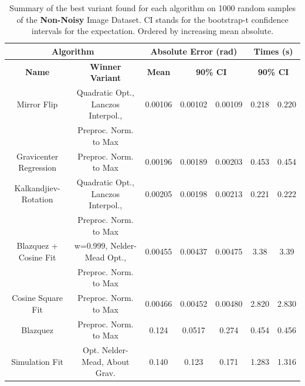 \documentclass[11pt, a4paper, twoside]{article} %
\begin{document}
\begin{table}[h!]
\caption{Summary of the best variant found for each algorithm on 1000 random samples of the {\bf Non-Noisy} Image Dataset. CI stands for the bootstrap-t confidence intervals \cite{boots} for the expectation. Ordered by increasing mean absolute.\vspace{-0.4cm}}
\center
{\small 
\label{tab:nonnoisy}
\begin{tabular}{c|c|c|cc|cc}
\toprule
\multicolumn{2}{c|}{\bf Algorithm} &  \multicolumn{3}{|c|}{\bf Absolute Error (rad)} & \multicolumn{2}{|c}{\bf Times (s)} \\ \midrule \midrule
{\bf                     Name} &                          {\bf Winner} {\bf Variant} &  {\bf Mean} &  \multicolumn{2}{c|}{\bf 90\% CI } &  \multicolumn{2}{|c}{\bf 90\% CI }\\
\bottomrule\rule{0pt}{4mm}{}
           Mirror Flip & Quadratic Opt., Lanczos Interpol.,  & 0.00106 &    0.00102 &   0.00109 &        0.218 &       0.220 \\
                       &               Preproc. Norm. to Max &         &            &           &              &             \\ \hline\rule{0pt}{4mm}{}
Gravicenter Regression &               Preproc. Norm. to Max & 0.00196 &    0.00189 &   0.00203 &        0.453 &       0.454 \\ \hline\rule{0pt}{4mm}{}
  Kalkandjiev-Rotation &  Quadratic Opt., Lanczos Interpol., & 0.00205 &    0.00198 &   0.00213 &        0.221 &       0.222 \\
                       &               Preproc. Norm. to Max &         &            &           &              &             \\ \hline\rule{0pt}{4mm}{}
 Blazquez + Cosine Fit &         w=0.999, Nelder-Mead Opt.,  & 0.00455 &    0.00437 &   0.00475 &        3.38 &       3.39 \\
                       &               Preproc. Norm. to Max &         &            &           &              &             \\ \hline\rule{0pt}{4mm}{}
     Cosine Square Fit &               Preproc. Norm. to Max & 0.00466 &    0.00452 &   0.00480 &        2.820 &       2.830 \\ \hline\rule{0pt}{4mm}{}
              Blazquez &               Preproc. Norm. to Max & 0.124 &    0.0517 &   0.274 &        0.454 &       0.456 \\ \hline\rule{0pt}{4mm}{}
              Simulation Fit	& Opt. Nelder-Mead, About Grav.&	0.140	 & 0.123	& 0.171&	1.283	&1.316\\ 

\end{tabular}}
\end{table}
\end{document}
